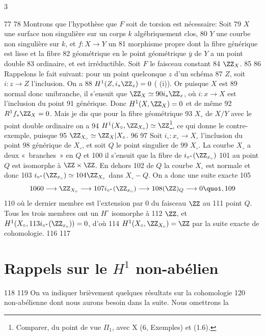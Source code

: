 3	\documentclass[10pt]{../fichiers-configuration-latex/smfart}
\begin{document}
    77	
    78	Montrons que l'hypothèse que $F$ soit de torsion est nécessaire: Soit
    79	$X$ une surface non singulière sur un corps $k$ algébriquement clos,
    80	$Y$ une courbe non singulière sur $k$, et $f:X\rightarrow Y$ un
    81	morphisme propre dont la fibre générique est lisse et la fibre
    82	géométrique en le point géométrique $\bar{y}$ de $Y$ a un point double
    83	ordinaire, et est irréductible. Soit $F$ le faisceau constant
    84	$\ZZ_X$.
    85	
    86	Rappelons le fait suivant: pour un point quelconque $z$ d'un schéma
    87	$Z$, soit $i:z\rightarrow Z$ l'inclusion. On a
    88	$H^1(Z,i_{\ast}\ZZ_z)=0$ ( (i)). Or puisque $X$ est
    89	normal donc unibranche, il s'ensuit que $\ZZ_X\simeq
    90	i_{\ast}\ZZ_x$, où $i:x\rightarrow X$ est l'inclusion du point
    91	générique. Donc $H^1(X,\ZZ_X)=0$ et de même
    92	$R^1f_{\ast}\ZZ_X=0$. Mais je dis que pour la fibre géométrique
    93	$X_{\circ}$ de $X/Y$ avec le point double ordinaire on a
    94	$H^1(X_{\circ},\ZZ_{X_{\circ}})\simeq \ZZ$\footnote[1]{Comparer, du point de vue $\Pi_1$, avec  X (6, Exemples) et (1.6).}, ce qui donne le contre-exemple, puisque
    95	$\ZZ_{X_{\circ}}\simeq \ZZ_X| X_{\circ}$.
    96	
    97	Soit $i_{\circ}:x_{\circ}\rightarrow X_{\circ}$ l'inclusion du point
    98	générique de $X_{\circ}$, et soit $Q$ le point singulier de
    99	$X_{\circ}$. La courbe $X_{\circ}$ a deux « branches »  en $Q$ et
   100	il s'ensuit que la fibre de $i_{\circ^{\ast}}(\ZZ_{x_{\circ}})$
   101	au point $Q$ est isomorphe à $\ZZ\times \ZZ$. En dehors
   102	de $Q$ la courbe $X_{\circ}$ est normale et donc
   103	$i_{\circ^{\ast}}(\ZZ_{x_{\circ}})\simeq
   104	\ZZ_{X_{\circ}}$ dans $X_{\circ}-Q$. On a donc une suite exacte
   105	$$
   106	0\longrightarrow \ZZ_{X_{\circ}}\longrightarrow
   107	i_{\circ^{\ast}}(\ZZ_{x_{\circ}})\longrightarrow
   108	(\ZZ)_Q\longrightarrow 0{\quoi},
   109	$$
   110	où le dernier membre est l'extension par $0$ du faisceau $\ZZ$ au
   111	point $Q$. Tous les trois membres ont un $H^{\circ}$ isomorphe à
   112	$\ZZ$, et $H^1(X_{\circ},
   113	i_{\circ^{\ast}}(\ZZ_{x_{\circ}}))=0$, d'où
   114	$H^1(X_{\circ},\ZZ_{X_{\circ}})=\ZZ$	par la suite exacte de cohomologie.
   116	
   117	\section{Rappels sur le $H^1$ non-abélien}
   118	
   119	On va indiquer brièvement quelques résultats sur la cohomologie
   120	non-abélienne dont nous aurons besoin dans la suite. Nous omettrons la
\end{document}
